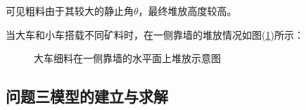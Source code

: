 \documentclass{my_paper}
\begin{document}
可见粗料由于其较大的静止角$\theta$，最终堆放高度较高。

当大车和小车搭载不同矿料时，在一侧靠墙的堆放情况如图(\ref{qiangdui})所示：
\begin{figure}[htbp]
    \centering  %

    \caption{大车细料在一侧靠墙的水平面上堆放示意图}    %
    \label{qiangdui}    %
\end{figure}

\subsection{问题三模型的建立与求解}
\end{document}
